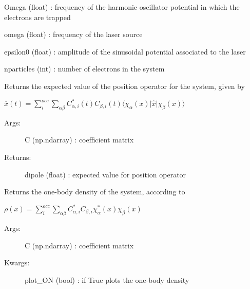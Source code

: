 \documentclass[letterpaper,10pt,english]{sphinxmanual}
\begin{document}
\begin{fulllineitems}
\begin{description}
Omega (float) : frequency of the harmonic oscillator potential in which the electrons are trapped

omega (float) : frequency of the laser source

epsilon0 (float) : amplitude of the sinusoidal potential associated to the laser

nparticles (int) : number of electrons in the system

\end{description}

\begin{fulllineitems}
\label{\detokenize{index:do.GHF.eval_dipole}}
Returns the expected value of the position operator for the system, given by

\(\overline{x}(t) = \sum_i^{occ} \sum_{\alpha\beta} C_{\alpha,i}^*(t) C_{\beta,i} (t) \langle \chi_{\alpha}(x) \vert \hat{x} \vert \chi_{\beta}(x)\rangle\)
\begin{description}
\item[{Args:}] \leavevmode
C (np.ndarray) : coefficient matrix

\item[{Returns:            }] \leavevmode
dipole (float) : expected value for position operator

\end{description}

\end{fulllineitems}


\begin{fulllineitems}
\label{\detokenize{index:do.GHF.eval_one_body_density}}
Returns the one-body density of the system, according to

\(\rho(x) = \sum_i^{occ} \sum_{\alpha\beta} C_{\alpha,i}^* C_{\beta,i} \chi_{\alpha}^*(x) \chi_{\beta}(x)\)
\begin{description}
\item[{Args:}] \leavevmode
C (np.ndarray) : coefficient matrix

\item[{Kwargs:}] \leavevmode
plot\_ON (bool) : if True plots the one-body density


\end{description}
\end{fulllineitems}
\end{fulllineitems}
\end{document}
